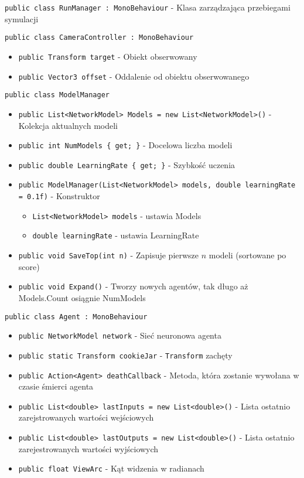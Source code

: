 \documentclass[12pt,a4paper]{article}
\begin{document}
\lstinline{public class RunManager : MonoBehaviour} - Klasa zarządzająca przebiegami symulacji


\lstinline{public class CameraController : MonoBehaviour}
\begin{itemize}
    \item \lstinline|public Transform target| - Obiekt obserwowany
    \item \lstinline|public Vector3 offset| - Oddalenie od obiektu obserwowanego
\end{itemize}


\lstinline{public class ModelManager}
\begin{itemize}
    \item \lstinline|public List<NetworkModel> Models = new List<NetworkModel>()| - Kolekcja aktualnych modeli
    \item \lstinline|public int NumModels { get; }| - Docelowa liczba modeli
    \item \lstinline|public double LearningRate { get; }| - Szybkość uczenia
    \item \lstinline|public ModelManager(List<NetworkModel> models, double learningRate = 0.1f)| - Konstruktor
          \begin{itemize}
              \item \lstinline{List<NetworkModel> models} - ustawia Models
              \item \lstinline{double learningRate} - ustawia LearningRate
          \end{itemize}
    \item \lstinline|public void SaveTop(int n)| - Zapisuje pierwsze $n$ modeli (sortowane po score)
    \item \lstinline|public void Expand()| - Tworzy nowych agentów, tak długo aż Models.Count osiągnie NumModels
\end{itemize}


\lstinline{public class Agent : MonoBehaviour}
\begin{itemize}
    \item \lstinline|public NetworkModel network| - Sieć neuronowa agenta
    \item \lstinline|public static Transform cookieJar| - \lstinline{Transform} zachęty
    \item \lstinline|public Action<Agent> deathCallback| - Metoda, która zostanie wywołana w czasie śmierci agenta
    \item \lstinline|public List<double> lastInputs = new List<double>()| - Lista ostatnio zarejstrowanych wartości wejściowych
    \item \lstinline|public List<double> lastOutputs = new List<double>()| - Lista ostatnio zarejestrowanych wartości wyjściowych
    \item \lstinline|public float ViewArc| - Kąt widzenia w radianach
\end{itemize}
\end{document}
